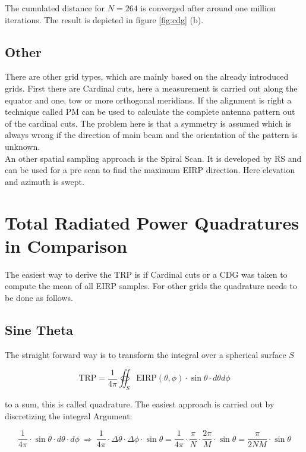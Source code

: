 The cumulated distance for $N = 264$ is converged after around one million iterations. The result is depicted in figure \ref{fig:cdg} (b).

\subsection{Other}

There are other grid types, which are mainly based on the already introduced grids. First there are Cardinal cuts, here a measurement is carried out along the equator and one, tow or more orthogonal meridians. If the alignment is right a technique called \acf{PM} can be used to calculate the complete antenna pattern out of the cardinal cuts. The problem here is that a symmetry is assumed which is always wrong if the direction of main beam and the orientation of the pattern is unknown. \cite{2018arXiv180310993F}\\
An other spatial sampling approach is the Spiral Scan. It is developed by \ac{RS} and can be used for a pre scan to find the maximum \ac{EIRP} direction. Here elevation and azimuth is swept. \cite{ctiaat}

\section{Total Radiated Power Quadratures in Comparison}
\label{sec:quadrature}

The easiest way to derive the \ac{TRP} is if Cardinal cuts or a \ac{CDG} was taken to compute the mean of all \ac{EIRP} samples. For other grids the quadrature needs to be done as follows. \cite{trp}

\subsection{Sine Theta}

The straight forward way is to transform the integral over a spherical surface $S$

\begin{equation}
\text{TRP} = \frac{1}{4\pi}  \oiint_S \text{EIRP}\left(\theta,\phi\right)\cdot\sin\theta\cdot d\theta d\phi
\label{eq:trpint}
\end{equation}

to a sum, this is called quadrature. The easiest approach is carried out by discretizing the integral Argument:  \cite{ctiaat}

\begin{equation}
\frac{1}{4\pi}\cdot\sin\theta\cdot d\theta\cdot d\phi \ \Rightarrow\ \frac{1}{4\pi}\cdot \Delta\theta\cdot \Delta\phi\cdot\sin\theta = \frac{1}{4\pi}\cdot \frac{\pi}{N}\cdot \frac{2\pi}{M}\cdot\sin\theta=\frac{\pi}{2NM}\cdot\sin\theta
\end{equation}

